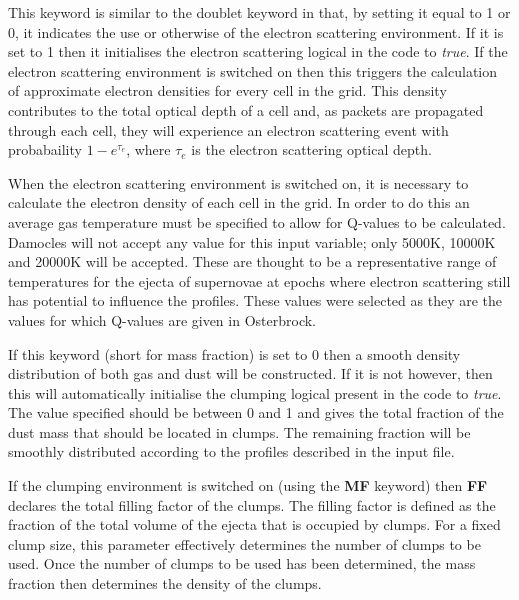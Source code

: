 
 This keyword is similar to the doublet keyword in that, by setting it equal to 1 or 0, it indicates the use or otherwise of the electron scattering environment.  If it is set to 1 then it initialises the electron scattering logical in the code to \textit{true}.  If the electron scattering environment is switched on then this triggers the calculation of approximate electron densities for every cell in the grid.  This density contributes to the total optical depth of a cell and, as packets are propagated through each cell, they will experience an electron scattering event with probabaility $1-e^{\tau_e}$, where $\tau_e$ is the electron scattering optical depth.


 When the electron scattering environment is switched on, it is necessary to calculate the electron density of each cell in the grid.  In order to do this an average gas temperature must be specified to allow for Q-values to be calculated.  Damocles will not accept any value for this input variable; only 5000K, 10000K and 20000K will be accepted.  These are thought to be a representative range of temperatures for the ejecta of supernovae at epochs where electron scattering still has potential to influence the profiles.  These values were selected as they are the values for which Q-values are given in Osterbrock.  %



 If this keyword (short for mass fraction) is set to 0 then a smooth density distribution of both gas and dust will be constructed.   If it is not however, then this will automatically initialise the clumping logical present in the code to \textit{true}.  The value specified should be between 0 and 1 and gives the total fraction of the dust mass that should be located in clumps.  The remaining fraction will be smoothly distributed according to the profiles described in the input file.


 If the clumping environment is switched on (using the \textbf{MF} keyword) then \textbf{FF} declares the total filling factor of the clumps.  The filling factor is defined as the fraction of the total volume of the ejecta that is occupied by clumps.  For a fixed clump size, this parameter effectively determines the number of clumps to be used.  Once the number of clumps to be used has been determined, the mass fraction then determines the density of the clumps.
 
